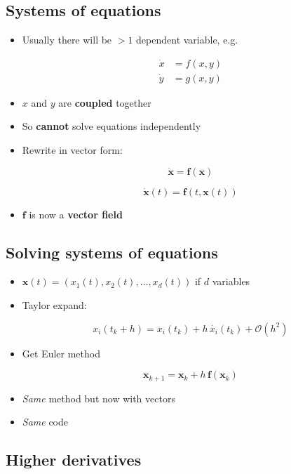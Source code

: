 \documentclass[
]{article}
\begin{document}
\hypertarget{systems-of-equations}{%
\subsection{Systems of equations}\label{systems-of-equations}}

\begin{itemize}
\item
  Usually there will be \(>1\) dependent variable, e.g.

  \begin{align*}
    \dot{x} &= f(x, y) \\
    \dot{y} &= g(x, y)
    \end{align*}
\item
  \(x\) and \(y\) are \textbf{coupled} together
\item
  So \textbf{cannot} solve equations independently
\item
  Rewrite in vector form:

  \[\dot{\mathbf{x}} = \mathbf{f}(\mathbf{x})\]

  \[\dot{\mathbf{x}}(t) = \mathbf{f}(t, \mathbf{x}(t))\]
\item
  \(\mathbf{f}\) is now a \textbf{vector field}
\end{itemize}

\hypertarget{solving-systems-of-equations}{%
\subsection{Solving systems of
equations}\label{solving-systems-of-equations}}

\begin{itemize}
\item
  \(\mathbf{x}(t) = (x_1(t), x_2(t), \ldots, x_d(t))\) if \(d\)
  variables
\item
  Taylor expand:

  \[x_i(t_k + h) = x_i(t_k) + h \, \dot{x_i}(t_k) + \mathcal{O}(h^2)\]
\item
  Get Euler method

  \[\mathbf{x}_{k+1} = \mathbf{x}_k + h \, \mathbf{f}(\mathbf{x}_k)\]
\item
  \emph{Same} method but now with vectors
\item
  \emph{Same} code
\end{itemize}

\hypertarget{higher-derivatives}{%
\subsection{Higher derivatives}\label{higher-derivatives}}
\end{document}
